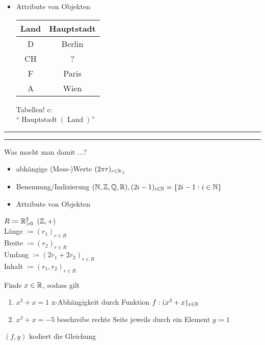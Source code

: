 \documentclass{gadsescript}
\begin{document}
\begin{itemize}
	\item Attribute von Objekten\\[1em]
		\begin{tabular}{c|c}
			Land & Hauptstadt\\
			\hline
			D	& Berlin\\
			CH	& ?\\
			F	& Paris\\
			A	& Wien\\
		\end{tabular}
		\hspace{2em}
		\begin{minipage}{0.5\textwidth}
			Tabellen! c:\\
			``$\operatorname{Hauptstadt}(\operatorname{Land})$''
		\end{minipage}
\end{itemize}

\hrule width 50pt \kern 1pt \hrule width 50pt
Was macht man damit ...?
\begin{itemize}
	\item abhängige (Mess-)Werte \qquad $ (2 \pi r )_{ r \in \mathbb{R}_{\geq} } $
	\item Benennung/Indizierung \qquad $ ( \mathbb{N}, \mathbb{Z}, \mathbb{Q}, \mathbb{R} ), ( 2i - 1 )_{ i \in \mathbb{N} } = \{ 2i - 1 : i \in \mathbb{N} \} $
	\item Attribute von Objekten
\end{itemize}

\hspace{2em}
\begin{minipage}{0.5\textwidth}
	$ R \coloneqq \mathbb{R}_{>0}^{2} $ \qquad $ ( \mathbb{Z}, + ) $\\
	Länge $ \coloneqq (r_1)_{r \in R} $\\
	Breite $ \coloneqq ( r_2 )_{r \in R} $\\
	Umfang $ \coloneqq ( 2r_1 + 2r_2)_{r \in R} $\\
	Inhalt $ \coloneqq ( r_1, r_2 )_{r \in R} $
\end{minipage}

\begin{example}[``Gleichungen'']
	Finde $ x \in \mathbb{R} $, sodass gilt
	\begin{enumerate}[label=\alph*)]
		\item $ x^3 + x = 1 $ \quad\qquad x-Abhängigkeit durch Funktion $ f : (x^3 + x )_{x \in \mathbb{R}} $
		\item $ x^3 + x =  -5 $ \qquad beschreibe rechte Seite jeweils durch ein Element $ y \coloneqq 1 $
	\end{enumerate}
	$ ( f, y ) $ kodiert die Gleichung
\end{example}
\end{document}
